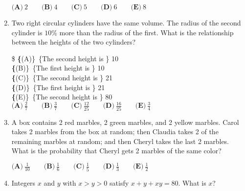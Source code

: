 \documentclass{article}
\begin{document}
\begin{enumerate}[label=\arabic*., itemsep=0.5em]
$ \textbf{(A)}\ 2 \qquad\textbf{(B)}\ 4 \qquad\textbf{(C)}\ 5 \qquad\textbf{(D)}\ 6 \qquad\textbf{(E)}\ 8$\par \vspace{0.5em}\item Two right circular cylinders have the same volume. The radius of the second cylinder is $10\%$ more than the radius of the first. What is the relationship between the heights of the two cylinders?

\$ \textbf\{(A)\}\ \text\{The second height is \} 10\\%
\qquad\textbf\{(B)\}\ \text\{The first height is \} 10\\%
\qquad\textbf\{(C)\}\ \text\{The second height is \} 21\\%
\qquad\textbf\{(D)\}\ \text\{The first height is \} 21\\%
\qquad\textbf\{(E)\}\ \text\{The second height is \} 80\\%

$ \textbf{(A)}\ \frac27 \qquad\textbf{(B)}\ \frac37 \qquad\textbf{(C)}\ \frac{12}{25} \qquad\textbf{(D)}\ \frac{16}{25} \qquad\textbf{(E)}\ \frac34$\par \vspace{0.5em}\item A box contains 2 red marbles, 2 green marbles, and 2 yellow marbles. Carol takes 2 marbles from the box at random; then Claudia takes 2 of the remaining marbles at random; and then Cheryl takes the last 2 marbles. What is the probability that Cheryl gets 2 marbles of the same color?

$ \textbf{(A)}\ \frac{1}{10} \qquad\textbf{(B)}\ \frac16 \qquad\textbf{(C)}\ \frac15 \qquad\textbf{(D)}\ \frac13 \qquad\textbf{(E)}\ \frac12$\par \vspace{0.5em}\item Integers $x$ and $y$ with $x>y>0$ satisfy $x+y+xy=80$. What is $x$?


\end{enumerate}
\end{document}
